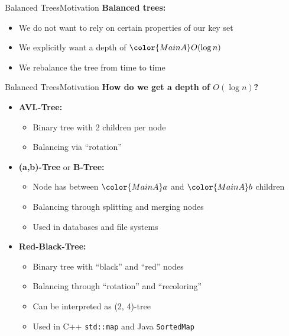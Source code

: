 
\begin{frame}{Balanced Trees}{Motivation}
  \textbf{Balanced trees:}
  \begin{itemize}
    \item<2->
      We do not want to rely on certain properties of our {\color{MainA}key set}
    \item<3->
      We explicitly want a depth of ${\color{MainA}O(\log n)}$
    \item<4->
      We {\color{MainA}rebalance} the tree from time to time
  \end{itemize}
\end{frame}


\begin{frame}{Balanced Trees}{Motivation}
  \textbf{How do we get a depth of {\color{MainA}$O(\log n)$}?}
  \begin{itemize}
    \item<2->
      \textbf{AVL-Tree:}
      \begin{itemize}
        \item<3->
          Binary tree with 2 children per node
        \item<4->
          Balancing via \enquote{\color{MainA}rotation}
      \end{itemize}
    \item<5->
      \textbf{(a,b)-Tree} or \textbf{B-Tree:}
      \begin{itemize}
        \item<6->
          Node has between ${\color{MainA}a}$ and ${\color{MainA}b}$ children
        \item<7->
          Balancing through {\color{MainA}splitting} and
          {\color{MainA}merging} nodes
        \item<8->
          Used in databases and file systems
      \end{itemize}
    \item<9->
      \textbf{Red-Black-Tree:}
      \begin{itemize}
        \item<10->
          Binary tree with \enquote{black} and \enquote{red} nodes
        \item<11->
          Balancing through \enquote{\color{MainA}rotation} and
          \enquote{\color{MainA}recoloring}
        \item<12->
          Can be interpreted as (2, 4)-tree
        \item<13->
          Used in C++ \texttt{std::map} and Java \texttt{SortedMap}
      \end{itemize}
  \end{itemize}
\end{frame}
